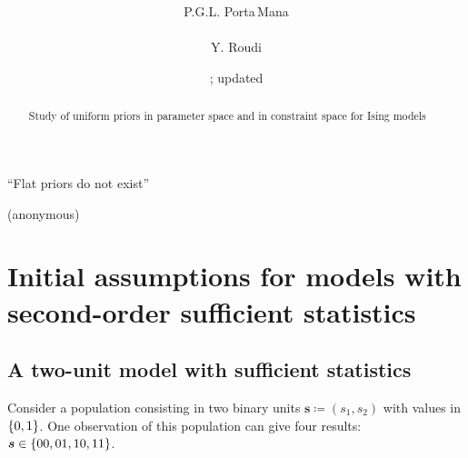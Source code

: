 \documentclass[\ifafour a4paper,12pt,\else a5paper,10pt,\fi%
onecolumn,oneside,article,%
british%
]{memoir}
\title{\propertitle%
}
\author{%
\hspace*{\stretch{1}}%
\parbox{0.5\linewidth}%
{\protect\centering P.G.L. Porta\,Mana\\%
\footnotesize\epost{\email{piero.mana}{ntnu.no}}}%
\hspace*{\stretch{1}}%
\parbox{0.5\linewidth}%
{\protect\centering Y. Roudi\\%
\footnotesize\epost{\email{yasser.roudi}{ntnu.no}}}%
\hspace*{\stretch{1}}%
}
\date{\firstdraft; updated \updated}
\theoremstyle{remark}
\theoremstyle{innote}
\newcommand*{\asudedication}[1]{%
{\par\centering\textit{#1}\par}}
\newcommand*{\defd}{\coloneqq}
\DeclarePairedDelimiter\set{\{}{\}}
\renewcommand*{\|}{\mathpunct{|}}
\newcommand*{\ys}{\bm{s}}
\begin{document}
\captiondelim{\quad}\captionnamefont{\footnotesize}\captiontitlefont{\footnotesize}
\frenchspacing

\maketitle
\ifpublic
\abstractrunin
\abslabeldelim{}
\renewcommand*{\abstractname}{}
\setlength{\absleftindent}{0pt}
\setlength{\absrightindent}{0pt}
\setlength{\abstitleskip}{-\absparindent}
\begin{abstract}%
  \noindent Study of uniform priors in parameter space and in constraint
  space for Ising models
\end{abstract}\fi

\frenchspacing

\setlength{\epigraphwidth}{.63\columnwidth}
\epigraphfontsize{\footnotesize}
\setlength{\epigraphrule}{0pt}
\epigraph{\enquote{Flat priors do not exist}}{(anonymous)}

\section{Initial assumptions for models with second-order sufficient
  statistics}
\label{sec:2_suff_stat}

\subsection{A two-unit model with sufficient statistics}
\label{sec:intro}

Consider a population consisting in two binary units $\ys \defd (s_1,s_2)$
with values in $\set{0,1}$. One observation of this population can give
four results: $\ys \in \set{00,01,10,11}$.
\end{document}
